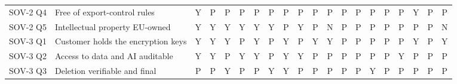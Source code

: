 \begin{table}[p]
\begin{tabular}{@{}l l *{18}{c}@{}}
SOV-2 Q4 & Free of export-control rules & \cellcolor{green!22}Y & \cellcolor{orange!25}P & \cellcolor{orange!25}P & \cellcolor{orange!25}P & \cellcolor{orange!25}P & \cellcolor{orange!25}P & \cellcolor{orange!25}P & \cellcolor{orange!25}P & \cellcolor{orange!25}P & \cellcolor{orange!25}P & \cellcolor{orange!25}P & \cellcolor{orange!25}P & \cellcolor{orange!25}P & \cellcolor{orange!25}P & \cellcolor{orange!25}P & \cellcolor{green!22}Y & \cellcolor{orange!25}P & \cellcolor{orange!25}P \\
SOV-2 Q5 & Intellectual property EU-owned & \cellcolor{green!22}Y & \cellcolor{green!22}Y & \cellcolor{green!22}Y & \cellcolor{green!22}Y & \cellcolor{green!22}Y & \cellcolor{green!22}Y & \cellcolor{orange!25}P & \cellcolor{green!22}Y & \cellcolor{orange!25}P & \cellcolor{red!25}N & \cellcolor{orange!25}P & \cellcolor{orange!25}P & \cellcolor{orange!25}P & \cellcolor{orange!25}P & \cellcolor{orange!25}P & \cellcolor{orange!25}P & \cellcolor{orange!25}P & \cellcolor{red!25}N \\
\midrule
SOV-3 Q1 & Customer holds the encryption keys & \cellcolor{green!22}Y & \cellcolor{green!22}Y & \cellcolor{green!22}Y & \cellcolor{orange!25}P & \cellcolor{green!22}Y & \cellcolor{orange!25}P & \cellcolor{green!22}Y & \cellcolor{orange!25}P & \cellcolor{green!22}Y & \cellcolor{green!22}Y & \cellcolor{orange!25}P & \cellcolor{orange!25}P & \cellcolor{orange!25}P & \cellcolor{orange!25}P & \cellcolor{orange!25}P & \cellcolor{green!22}Y & \cellcolor{orange!25}P & \cellcolor{green!22}Y \\
SOV-3 Q2 & Access to data and AI auditable & \cellcolor{green!22}Y & \cellcolor{green!22}Y & \cellcolor{orange!25}P & \cellcolor{green!22}Y & \cellcolor{green!22}Y & \cellcolor{orange!25}P & \cellcolor{green!22}Y & \cellcolor{green!22}Y & \cellcolor{orange!25}P & \cellcolor{orange!25}P & \cellcolor{orange!25}P & \cellcolor{orange!25}P & \cellcolor{orange!25}P & \cellcolor{orange!25}P & \cellcolor{green!22}Y & \cellcolor{orange!25}P & \cellcolor{orange!25}P & \cellcolor{orange!25}P \\
SOV-3 Q3 & Deletion verifiable and final & \cellcolor{orange!25}P & \cellcolor{orange!25}P & \cellcolor{green!22}Y & \cellcolor{orange!25}P & \cellcolor{orange!25}P & \cellcolor{green!22}Y & \cellcolor{green!22}Y & \cellcolor{orange!25}P & \cellcolor{orange!25}P & \cellcolor{orange!25}P & \cellcolor{orange!25}P & \cellcolor{orange!25}P & \cellcolor{green!22}Y & \cellcolor{orange!25}P & \cellcolor{orange!25}P & \cellcolor{orange!25}P & \cellcolor{orange!25}P & \cellcolor{orange!25}P \\

\end{tabular}
\end{table}

